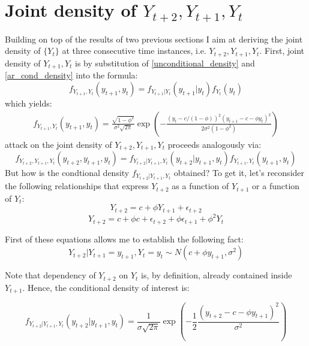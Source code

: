 \documentclass[12pt]{article}
\begin{document}
\section{Joint density of $Y_{t+2}, Y_{t+1}, Y_t$}
Building on top of the results of two previous sections I aim at deriving the joint 
density of $\{Y_t\}$ at three consecutive time instances, i.e. $Y_{t+2}, Y_{t+1}, Y_t$.
First, joint density of $Y_{t+1}, Y_t$ is by substitution of
 \eqref{unconditional_density} and \eqref{ar_cond_density} into the formula:
\begin{equation*}
f_{Y_{t+1}, Y_t} (y_{t+1}, y_t) = f_{Y_{t+1} | Y_t} (y_{t+1} | y_t) f_{Y_t}(y_t)
\end{equation*}
which yields:
\begin{eqnarray*}
\label{bivariate_density}
f_{Y_{t+1}, Y_t}(y_{t+1}, y_t) =
\frac{\sqrt{1 - \phi^2}}{\sigma^2 \sqrt{2 \pi}}
\exp \left(
-\frac{(y_t - c/(1-\phi))^2
(y_{t+1} - c - \phi y_t)^2}
{2\sigma^2(1- \phi^2)} 
\right)
\end{eqnarray*}
attack on the joint density of $Y_{t+2}, Y_{t+1}, Y_t$ proceeds analogously via:
\begin{equation*}
f_{Y_{t+2}, Y_{t+1}, Y_t} (y_{t+2}, y_{t+1}, y_t) = 
f_{Y_{t+2} | Y_{t+1}, Y_t} (y_{t+2} | y_{t+1}, y_t) f_{Y_{t+1}, Y_t}(y_{t+1}, y_t)
\end{equation*}
But how is the condtional density $f_{Y_{t+2} | Y_{t+1}, Y_t}$ obtained? 
To get it, let's reconsider the following relationships that express $Y_{t+2}$ as 
a function of $Y_{t+1}$ or a function of $Y_t$:
\begin{equation*}
Y_{t+2} = c + \phi Y_{t+1} + \epsilon_{t+2}
\end{equation*}
\begin{equation*}
Y_{t+2} = c + \phi c + \epsilon_{t+2} + \phi \epsilon_{t+1} + \phi^2 Y_t
\end{equation*}

First of these equations allows me to establish the following fact:
\begin{equation*}
Y_{t+2} | Y_{t+1} = y_{t+1} , Y_t = y_t \sim N(c + \phi y_{t+1}, \sigma^2)
\end{equation*}

Note that dependency of $Y_{t+2}$ on $Y_t$ is, by definition, already contained inside 
$Y_{t+1}$. Hence, the conditional density of interest is:

\begin{equation*}
f_{Y_{t+2} | Y_{t+1}, Y_t} (y_{t+2} | y_{t+1}, y_t) = 
\frac{1}{\sigma \sqrt{2 \pi}} 
\exp \left(
-\frac{1}{2} \frac{(y_{t+2} - c - \phi y_{t+1})^2}{\sigma^2}
\right)
\end{equation*}
\end{document}
